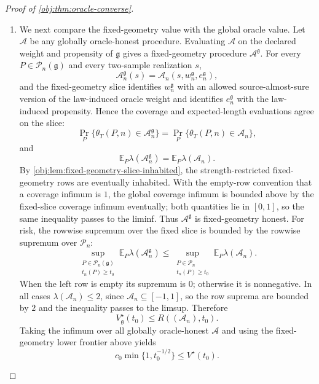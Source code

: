 \documentclass[11pt]{article}
\begin{document}
\begin{proof}[Proof of \cref{obj:thm:oracle-converse}]
\begin{enumerate}
\item We next compare the fixed-geometry value with the global oracle value. Let
\(\mathcal A\) be any globally oracle-honest procedure. Evaluating \(\mathcal A\) on the
declared weight and propensity of \(\mathfrak g\) gives a fixed-geometry procedure
\(\mathcal A^{\mathfrak g}\). For every \(P\in\mathcal P_n(\mathfrak g)\) and every
two-sample realization \(s\),
\[
  \mathcal A^{\mathfrak g}_n(s)
  =
  \mathcal A_n(s,w^{\mathfrak g}_n,e^{\mathfrak g}_n),
\]
and the fixed-geometry slice identifies \(w^{\mathfrak g}_n\) with an allowed
source-almost-sure version of the law-induced oracle weight and identifies
\(e^{\mathfrak g}_n\) with the law-induced propensity. Hence the coverage and expected-length
evaluations agree on the slice:
\[
  \Pr_P\{\theta_T(P,n)\in \mathcal A^{\mathfrak g}_n\}
  =
  \Pr_P\{\theta_T(P,n)\in \mathcal A_n\},
\]
and
\[
  \mathbb E_P\lambda(\mathcal A^{\mathfrak g}_n)
  =
  \mathbb E_P\lambda(\mathcal A_n).
\]
By \cref{obj:lem:fixed-geometry-slice-inhabited}, the strength-restricted fixed-geometry
rows are eventually inhabited. With the empty-row convention that a coverage infimum is
\(1\), the global coverage infimum is bounded above by the fixed-slice coverage infimum
eventually; both quantities lie in \([0,1]\), so the same inequality passes to the liminf.
Thus \(\mathcal A^{\mathfrak g}\) is fixed-geometry honest. For risk, the rowwise supremum
over the fixed slice is bounded by the rowwise supremum over \(\mathcal P_n\):
\[
  \sup_{\substack{P\in\mathcal P_n(\mathfrak g)\\ t_n(P)\ge t_0}}
  \mathbb E_P\lambda(\mathcal A^{\mathfrak g}_n)
  \le
  \sup_{\substack{P\in\mathcal P_n\\ t_n(P)\ge t_0}}
  \mathbb E_P\lambda(\mathcal A_n).
\]
When the left row is empty its supremum is \(0\); otherwise it is nonnegative. In all cases
\(\lambda(\mathcal A_n)\le 2\), since \(\mathcal A_n\subseteq[-1,1]\), so the row suprema
are bounded by \(2\) and the inequality passes to the limsup. Therefore
\[
  V_{\mathfrak g}^\star(t_0)
  \le
  R((\mathcal A_n),t_0).
\]
Taking the infimum over all globally oracle-honest \(\mathcal A\) and using the fixed-geometry
lower frontier above yields
\[
  c_0\min\{1,t_0^{-1/2}\}
  \le
  V^\star(t_0).
\] %


\end{enumerate}
\end{proof}
\end{document}
